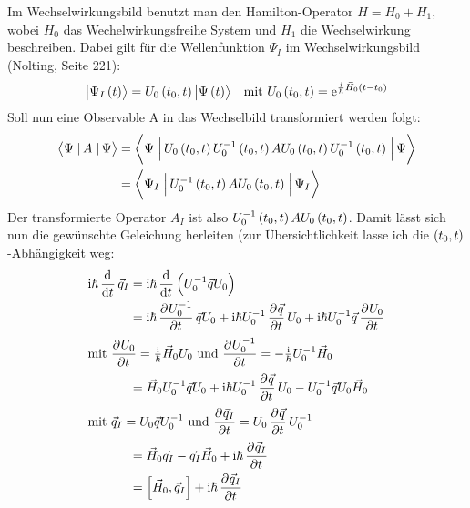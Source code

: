 Im Wechselwirkungsbild benutzt man den Hamilton-Operator $H=H_0+H_1$, wobei $H_0$ das Wechelwirkungsfreihe System und $H_1$ die Wechselwirkung beschreiben. Dabei gilt für die Wellenfunktion $\Psi_I$ im Wechselwirkungsbild (Nolting, Seite 221):
\begin{align*}
	\ket{\Psi_I\del{t}}=U_0\del{t_0,t}\ket{\Psi\del{t}}&&\text{mit }U_0\del{t_0,t}=\ee^{\frac{\ii}{\hbar}\vec{H}_0\del{t-t_0}}
\end{align*}
Soll nun eine Observable A in das Wechselbild transformiert werden folgt:
\begin{align*}
	\braopket{\Psi}{A}{\Psi}&=\braopket{\Psi}{U_0\del{t_0,t}U_0^{-1}\del{t_0,t}AU_0\del{t_0,t}U_0^{-1}\del{t_0,t}}{\Psi}\\
	&=\braopket{\Psi_I}{U_0^{-1}\del{t_0,t}AU_0\del{t_0,t}}{\Psi_I}\\
\end{align*}
Der transformierte Operator $A_I$ ist also $U_0^{-1}\del{t_0,t}AU_0\del{t_0,t}$. Damit lässt sich nun die gewünschte Geleichung herleiten (zur Übersichtlichkeit lasse ich die $\del{t_0,t}$-Abhängigkeit weg:
\begin{align*}
	\ii\hbar\dod{}{t}\vec{q}_I&=\ii\hbar\dod{}{t}\del{U_0^{-1}\vec{q}U_0}\\
	&=\ii\hbar\dpd{U_0^{-1}}{t}\vec{q}U_0+\ii\hbar U_0^{-1}\dpd{\vec{q}}{t}U_0+\ii\hbar U_0^{-1}\vec{q}\dpd{U_0}{t}\\
	\intertext{%
		mit $\dpd{U_0}{t}=\frac{\ii}{\hbar}\vec{H}_0U_0$ und $\dpd{U_0^{-1}}{t}=-\frac{\ii}{\hbar}U_0^{-1}\vec{H}_0$
	}
	&=\vec{H}_0U_0^{-1}\vec{q}U_0+\ii\hbar U_0^{-1}\dpd{\vec{q}}{t}U_0-U_0^{-1}\vec{q}U_0\vec{H}_0\\
	\intertext{%
		mit $\vec{q}_I=U_0\vec{q}U_0^{-1}$ und $\dpd{\vec{q}_I}{t}=U_0\dpd{\vec{q}}{t}U_0^{-1}$
	}
	&=\vec{H}_0\vec{q}_I-\vec{q}_I\vec{H}_0+\ii\hbar\dpd{\vec{q}_I}{t}\\
	&=\left[\vec{H}_0,\vec{q}_I\right]+\ii\hbar\dpd{\vec{q}_I}{t}
\end{align*}



